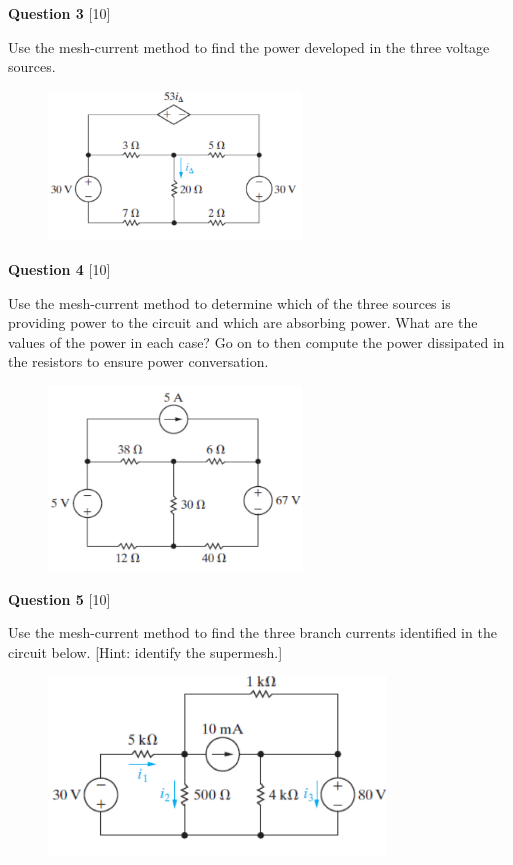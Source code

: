 \documentclass[12pt]{article}
\begin{document}
\noindent
{\bf Question 3} [10]

Use the mesh-current method to find the power developed in the three voltage sources.
\begin{figure}[h!]
  \centering 
  \includegraphics[clip,width=0.6\textwidth]{Fig4-40.png}
\end{figure}

\newpage
\noindent
{\bf Question 4} [10]

Use the mesh-current method to determine which of the three sources is providing power to the circuit and which are absorbing power. What are the values of the power in each case? Go on to then compute the power dissipated in the resistors to ensure power conversation. 
\vspace{0.1in}
\begin{figure}[h]
  \centering 
  \includegraphics[clip,width=0.6\textwidth]{Fig4-45.png}
\end{figure}

\vspace{0.1in}
\noindent
{\bf Question 5} [10]

Use the mesh-current method to find the three branch currents identified in the circuit below. [Hint: identify the supermesh.]
\begin{figure}[h!]
\centering 
\includegraphics[clip,width=0.8\textwidth]{Fig4-23.png}
\end{figure}
\end{document}
